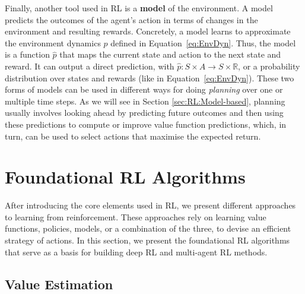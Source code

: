 Finally, another tool used in RL is a \textbf{model} of the environment. A model predicts the outcomes of the agent's action in terms of changes in the environment and resulting rewards. Concretely, a model learns to approximate the environment dynamics $p$ defined in Equation~\ref{eq:EnvDyn}. Thus, the model is a function $\widehat{p}$ that maps the current state and action to the next state and reward. It can output a direct prediction, with $\widehat{p}:S\times A\rightarrow S\times\mathbb{R}$, or a probability distribution over states and rewards (like in Equation~\ref{eq:EnvDyn}).
These two forms of models can be used in different ways for doing \textit{planning} over one or multiple time steps. As we will see in Section \ref{sec:RL:Model-based}, planning usually involves looking ahead by predicting future outcomes and then using these predictions to compute or improve value function predictions, which, in turn, can be used to select actions that maximise the expected return. 






\section{Foundational RL Algorithms}\label{sec:RL:Algorithms}

After introducing the core elements used in RL, we present different approaches to learning from reinforcement. These approaches rely on learning value functions, policies, models, or a combination of the three, to devise an efficient strategy of actions. In this section, we present the foundational RL algorithms that serve as a basis for building deep RL and multi-agent RL methods. 


\subsection{Value Estimation}\label{sec:RL:Value-based}

